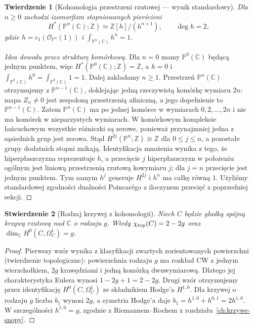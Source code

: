 \documentclass[11pt,a4paper,openany]{report}
\numberwithin{equation}{section}
\theoremstyle{plain}
\newtheorem{twierdzenie}{Twierdzenie}[section]
\newtheorem{stwierdzenie}[twierdzenie]{Stwierdzenie}
\theoremstyle{definition}
\theoremstyle{remark}
\newcommand{\Z}{\mathbb Z}
\newcommand{\C}{\mathbb C}
\newcommand{\PP}{\mathbb P}
\begin{document}
\begin{twierdzenie}[Kohomologia przestrzeni rzutowej — wynik standardowy]
\label{tw:ga10-cp-cohom}
Dla $n\ge0$ zachodzi izomorfizm stopniowanych pierścieni
\[
 H^*(\PP^n(\C);\Z)\simeq\Z[h]/(h^{n+1}),
 \qquad \deg h=2,
\]
gdzie $h=c_1(\mathcal O_{\PP^n}(1))$ i
$\int_{\PP^n(\C)}h^n=1$.
\end{twierdzenie}
\begin{proof}[Idea dowodu przez strukturę komórkową]
Dla $n=0$ mamy $\PP^0(\C)$ będącą jednym punktem,
więc $H^*(\PP^0(\C);\Z)=\Z$, a $h=0$ i
$\int_{\PP^0(\C)}h^0=\int_{\PP^0(\C)}1=1$.
Dalej zakładamy $n\ge1$.
Przestrzeń $\PP^n(\C)$ otrzymujemy z
$\PP^{n-1}(\C)$, doklejając jedną rzeczywistą komórkę
wymiaru $2n$: mapa $Z_n\ne0$ jest zespoloną przestrzenią
afiniczną, a jego dopełnienie to $\PP^{n-1}(\C)$.
Zatem $\PP^n(\C)$ ma po jednej komórce
w wymiarach $0,2,\ldots,2n$ i nie ma komórek
w nieparzystych wymiarach. W komórkowym kompleksie
łańcuchowym wszystkie różniczki są zerowe,
ponieważ przynajmniej jedna z sąsiednich grup jest zerowa.
Stąd $H^{2j}(\PP^n;\Z)\cong\Z$ dla $0\le j\le n$,
a pozostałe grupy dodatnich stopni znikają.
Identyfikacja mnożenia wynika z tego, że hiperpłaszczyzna
reprezentuje $h$, a przecięcie $j$ hiperpłaszczyzn w
położeniu ogólnym jest liniową przestrzenią rzutową
kowymiaru $j$; dla $j=n$ przecięcie jest jednym punktem.
Tym samym $h^j$ generuje $H^{2j}$ i $h^n$ ma całkę równą $1$.
Użyliśmy standardowej zgodności dualności Poincarégo
z iloczynem przecięć z poprzedniej sekcji.
\end{proof}

\begin{stwierdzenie}[Rodzaj krzywej z kohomologii]
Niech $C$ będzie gładką spójną krzywą rzutową nad $\C$
o rodzaju $g$. Wtedy $\chi_{\rm top}(C)=2-2g$ oraz
$\dim_{\C}H^0(C,\Omega^1_C)=g$.
\end{stwierdzenie}
\begin{proof}
Pierwszy wzór wynika z klasyfikacji zwartych zorientowanych
powierzchni (twierdzenie topologiczne): powierzchnia rodzaju $g$
ma rozkład CW z jednym wierzchołkiem, $2g$ krawędziami
i jedną komórką dwuwymiarową. Dlatego jej charakterystyka
Eulera wynosi $1-2g+1=2-2g$.
Drugi wzór otrzymujemy przez identyfikację
$H^0(C,\Omega^1_C)$ ze składnikiem Hodge'a $H^{1,0}$.
Dla krzywej o rodzaju $g$ liczba $b_1$ wynosi $2g$,
a symetria Hodge'a daje $b_1=h^{1,0}+h^{0,1}=2h^{1,0}$.
W szczególności $h^{1,0}=g$, zgodnie z Riemannem--Rochem
z rozdziału~\ref{ch:krzywe-snopy}.
\end{proof}
\end{document}
